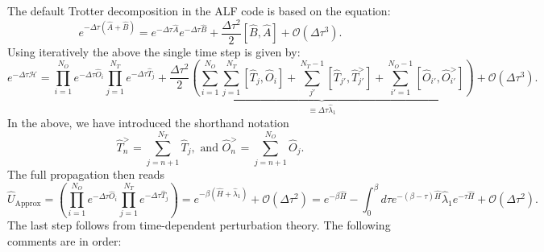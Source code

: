 The default Trotter decomposition in the ALF code is  based on the equation: 
\begin{equation}
	e^{ -\Delta \tau \left( \hat{A} + \hat{B} \right)  }  =  e^{ -\Delta \tau \hat{A}}  e^{ -\Delta \tau  \hat{B}  }   +  \frac{\Delta  \tau^2}{2} \left[ \hat{B}, \hat{A} \right] + \mathcal{O} \left (\Delta \tau ^3 \right).
\end{equation}
Using iteratively the above  the single time step is given by: 
\begin{equation}
    e^{-\Delta \tau \mathcal{H}}    =   \prod_{i=1}^{N_O} e^{-\Delta \tau \hat{O}_i} \prod_{j=1}^{N_T} e^{-\Delta \tau \hat{T}_j}  +  \underbrace{ \frac{\Delta \tau^2}{2}  
   \left(    \sum_{i=1}^{N_O}  \sum_{j=1}^{N_T} \left[ \hat{T}_j, \hat{O}_i \right]  +   \sum_{j'}^{N_T -1}  \left[ \hat{T}_{j'},   \hat{T}_{j'}^{>}\right] 
   +   \sum_{i'=1}^{N_O-1}  \left[ \hat{O}_{i'}, \hat{O}^{>}_{i'} \right]  \right)  }_{\equiv \Delta \tau \hat{\lambda}_1}   
   + \mathcal{O} \left( \Delta \tau^3 \right).
\end{equation}
In the above, we have introduced the shorthand notation 
\begin{equation}
\hat{T}_{n}^{>} = \sum_{j=n+1}^{N_T}  \hat{T}_{j}, \, \, \text{and} \, \, \hat{O}_{n}^{>} = \sum_{j=n+1}^{N_O}  \hat{O}_{j}.
\end{equation} 
The full propagation then reads
\begin{equation}
  \hat{U}_{\text{Approx}} =  \left(\prod_{i=1}^{N_O} e^{-\Delta \tau \hat{O}_i} \prod_{j=1}^{N_T} e^{-\Delta \tau \hat{T}_j}  \right)   = e^{-\beta \left(  \hat{H} + \hat{\lambda}_1 \right)} 
  + \mathcal{O} \left( \Delta \tau^2 \right)
  =  e^{-\beta  \hat{H}  }  - 
	 \int_0^{\beta}  d \tau  e^{-(\beta-\tau )\hat{H}} \hat{\lambda}_1  e^{-\tau \hat{H}}   +  \mathcal{O} (\Delta \tau^2 ).
\end{equation}
The last step follows from time-dependent perturbation theory. 
The following comments are in order:
